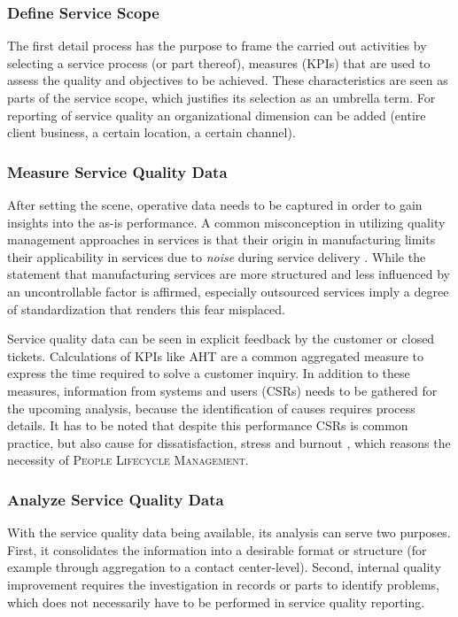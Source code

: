 	\subsubsection{Define Service Scope}
	The first detail process has the purpose to frame the carried out activities by selecting a service process (or part thereof), measures (\acrshort{KPI}s) that are used to assess the quality and objectives to be achieved. These characteristics are seen as parts of the service scope, which justifies its selection as an umbrella term. For reporting of service quality an organizational dimension can be added (entire client business, a certain location, a certain channel). 
	\subsubsection{Measure Service Quality Data}
	After setting the scene, operative data needs to be captured in order to gain insights into the as-is performance. A common misconception in utilizing quality management approaches in services is that their origin in manufacturing limits their applicability in services due to \textit{noise} during service delivery \citep{Antony_2007}. While the statement that manufacturing services are more structured and less influenced by an uncontrollable factor is affirmed, especially outsourced services imply a degree of standardization that renders this fear misplaced. 
	
	Service quality data can be seen in explicit feedback by the customer or closed tickets. Calculations of \acrshort{KPI}s like \acrfull{AHT} are a common aggregated measure to express the time required to solve a customer inquiry. In addition to these measures, information from systems and users (\acrshort{CSR}s) needs to be gathered for the upcoming analysis, because the identification of causes requires process details. It has to be noted that despite this performance \acrshort{CSR}s is common practice, but also cause for dissatisfaction, stress and burnout \citep[]{Aksin_2009}, which reasons the necessity of \textsc{People Lifecycle Management}.
	\subsubsection{Analyze Service Quality Data}
	With the service quality data being available, its analysis can serve two purposes. First, it consolidates the information into a desirable format or structure (for example through aggregation to a contact center-level). Second, internal quality improvement requires the investigation in records or parts to identify problems, which does not necessarily have to be performed in service quality reporting. 
	
